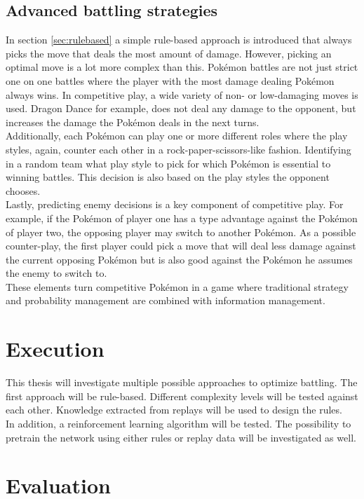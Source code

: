\documentclass{article}
\begin{document}
\subsection{Advanced battling strategies}
In section \ref{sec:rulebased} a simple rule-based approach is introduced that 
always picks the move that deals the most amount of damage. However, picking 
an optimal move is a lot more complex than this. Pokémon battles are not just
strict one on one battles where the player with the most damage dealing Pokémon
always wins. In competitive play, a wide variety of non- or low-damaging moves
is used. Dragon Dance for example, does not deal any damage to the opponent, 
but increases the damage the Pokémon deals in the next turns. \\
Additionally, each Pokémon can play one or more different roles where the 
play styles, again, counter each other in a rock-paper-scissors-like fashion. 
Identifying in a random team what play style to pick for which Pokémon is
essential to winning battles. This decision is also based on the play styles
the opponent chooses. \\
Lastly, predicting enemy decisions is a key component of competitive play. For 
example, if the Pokémon of player one has a type advantage against the Pokémon 
of player two, the opposing player may switch to another Pokémon. As a possible
counter-play, the first player could pick a move that will deal less damage
against the current opposing Pokémon but is also good against the Pokémon
he assumes the enemy to switch to. \\
These elements turn competitive Pokémon in a game where traditional strategy
and probability management are combined with information management.

\section{Execution}
This thesis will investigate multiple possible approaches to optimize battling.
The first approach will be rule-based. Different complexity levels will be
tested against each other. Knowledge extracted from replays will be used to design the 
rules. \\
In addition, a reinforcement learning algorithm will be tested. The possibility 
to pretrain the network using either rules or replay data will be investigated as well.

\section{Evaluation}
\end{document}
